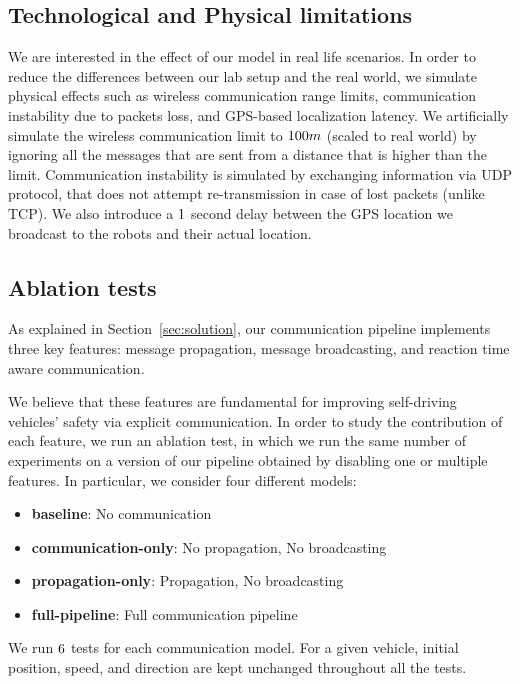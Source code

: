 \subsection{Technological and Physical limitations}
We are interested in the effect of our model in real life scenarios. In order to reduce the differences between 
our lab setup and the real world, we simulate physical effects such as wireless communication range limits, 
communication instability due to packets loss, and GPS-based localization latency.
We artificially simulate the wireless communication limit to $\wireless_limit_meter m$ (scaled to real world) by 
ignoring all the messages that are sent from a distance that is higher than the limit. Communication instability
is simulated by exchanging information via UDP protocol, that does not attempt re-transmission in case
of lost packets (unlike TCP). We also introduce a $\gps_delay_sec$ second delay between the GPS location 
we broadcast to the robots and their actual location.

\subsection{Ablation tests}
As explained in Section~\ref{sec:solution}, our communication pipeline implements three key features:
message propagation, message broadcasting, and reaction time aware communication.

We believe that these features are fundamental for improving self-driving vehicles' safety via explicit
communication. In order to study the contribution of each feature, we run an ablation test, in which we
run the same number of experiments on a version of our pipeline obtained by disabling one or multiple
features.
In particular, we consider four different models:

\begin{itemize}
\item \textbf{baseline}: No communication
\item \textbf{communication-only}: No propagation, No broadcasting
\item \textbf{propagation-only}: Propagation, No broadcasting
\item \textbf{full-pipeline}: Full communication pipeline
\end{itemize}

We run $\num_test_per_scenario$ tests for each communication model. For a given vehicle, initial position, 
speed, and direction are kept unchanged throughout all the tests.

